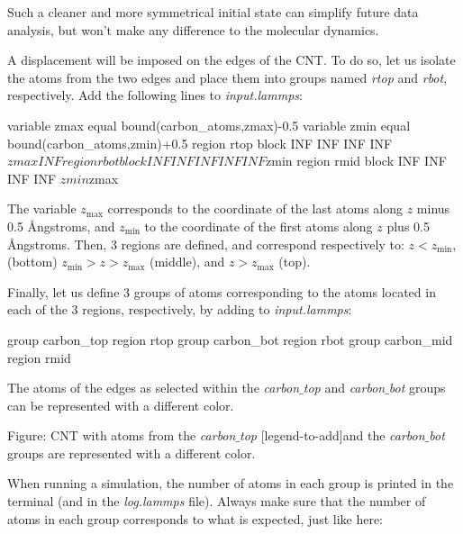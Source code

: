 \noindent \begin{tcolorbox}[colback=mylightblue!5!white,colframe=mylightblue!75!black,title=Note]

\vspace{0.25cm} \noindent Such a cleaner and more symmetrical initial state can simplify
future data analysis, but won't make any difference to 
the molecular dynamics.
\end{tcolorbox}

\noindent A displacement will be imposed on the edges of the CNT. To do so, let us isolate the
atoms from the two edges and place them into groups named \textit{rtop}
and \textit{rbot}, respectively.
Add the following lines to \textit{input.lammps}:

\begin{lcverbatim}
variable zmax equal bound(carbon_atoms,zmax)-0.5
variable zmin equal bound(carbon_atoms,zmin)+0.5
region rtop block INF INF INF INF ${zmax} INF
region rbot block INF INF INF INF INF ${zmin}
region rmid block INF INF INF INF ${zmin} ${zmax}
\end{lcverbatim}

\noindent The variable $z_\mathrm{max}$ corresponds to
the coordinate of the last atoms along $z$ minus 0.5
Ångstroms, and $z_\mathrm{min}$ to the coordinate of
the first atoms along $z$ plus 0.5 Ångstroms. Then, 3
regions are defined, and correspond respectively to: $z < z_\mathrm{min}$, (bottom)
$z_\mathrm{min} > z > z_\mathrm{max}$ (middle), and  
$z > z_\mathrm{max}$ (top).

\vspace{0.25cm} \noindent Finally, let us define 3 groups of atoms
corresponding to the atoms located in each of the 3 regions,
respectively, by adding to \textit{input.lammps}:

\begin{lcverbatim}
group carbon_top region rtop
group carbon_bot region rbot
group carbon_mid region rmid
\end{lcverbatim}

\noindent The atoms of the edges as selected within the \textit{carbon$\_$top}
and \textit{carbon$\_$bot} groups can be represented with a different color.

\vspace{0.25cm} Figure: CNT with atoms from the \textit{carbon$\_$top}
[legend-to-add]and the \textit{carbon$\_$bot} groups are represented with a different color.

\vspace{0.25cm} \noindent When running a simulation, the number of atoms in each group is printed in
the terminal (and in the \textit{log.lammps} file). Always make sure that the number
of atoms in each group corresponds to what is expected, just like here:

